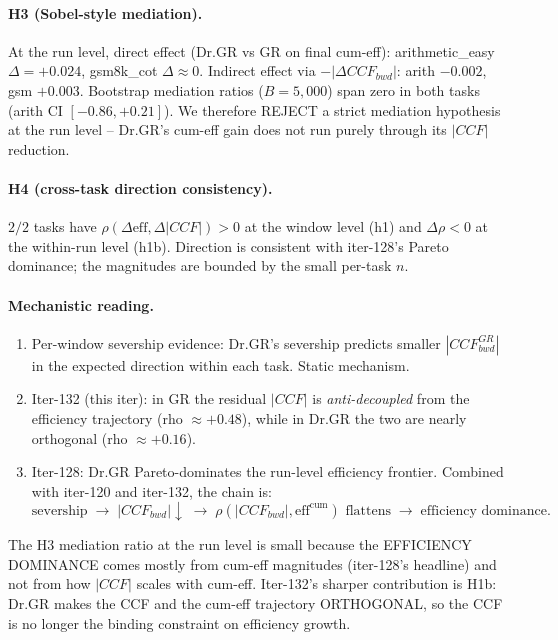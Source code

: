 \paragraph{H3 (Sobel-style mediation).}
At the run level, direct effect (Dr.GR vs GR on final cum-eff):
arithmetic\_easy $\Delta=+0.024$, gsm8k\_cot $\Delta\approx 0$.
Indirect effect via $-|\Delta CCF_{bwd}|$: arith $-0.002$, gsm $+0.003$.
Bootstrap mediation ratios ($B=5{,}000$) span zero in both tasks
(arith CI $[-0.86, +0.21]$).  We therefore REJECT a strict
mediation hypothesis at the run level -- Dr.GR's cum-eff gain
does not run purely through its $|\!CCF\!|$ reduction.

\paragraph{H4 (cross-task direction consistency).}
$2/2$ tasks have $\rho(\Delta\mathrm{eff}, \Delta|CCF|) > 0$ at the
window level (h1) and $\Delta\rho < 0$ at the within-run level
(h1b).  Direction is consistent with iter-128's Pareto dominance;
the magnitudes are bounded by the small per-task $n$.

\paragraph{Mechanistic reading.}
\begin{enumerate}
\item Per-window severship evidence: Dr.GR's severship predicts smaller
$|CCF^{GR}_{bwd}|$ in the expected direction within each task.  Static mechanism.
\item Iter-132 (this iter): in GR the residual $|CCF|$ is
\emph{anti-decoupled} from the efficiency trajectory (rho $\approx +0.48$),
while in Dr.GR the two are nearly orthogonal (rho $\approx +0.16$).
\item Iter-128: Dr.GR Pareto-dominates the run-level efficiency
frontier.  Combined with iter-120 and iter-132, the chain is:
\[
\text{severship} \;\longrightarrow\; |CCF_{bwd}|\downarrow
\;\longrightarrow\; \rho(|CCF_{bwd}|, \mathrm{eff}^{\mathrm{cum}})
\text{ flattens} \;\longrightarrow\; \text{efficiency dominance}.
\]
\end{enumerate}

The H3 mediation ratio at the run level is small because the
EFFICIENCY DOMINANCE comes mostly from cum-eff magnitudes
(iter-128's headline) and not from how $|CCF|$ scales with cum-eff.
Iter-132's sharper contribution is H1b: Dr.GR makes the CCF and
the cum-eff trajectory ORTHOGONAL, so the CCF is no longer the
binding constraint on efficiency growth.
